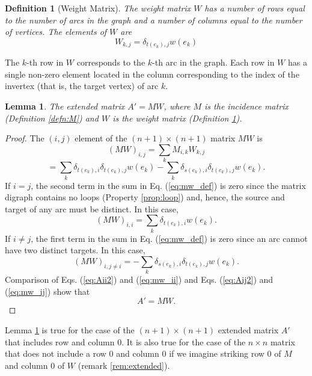 \documentclass{article}
\newtheorem{lemma}{Lemma}
\newtheorem{defn}{Definition}
\begin{document}
\begin{defn}[Weight Matrix]
The weight matrix $W$ has a number of rows equal to the number of arcs
in the graph and a number of columns equal to the number of vertices.
The elements of $W$ are
\begin{equation}
W_{k,j} = \delta_{t(e_k),j}w(e_k)
\label{eq:weight_matrix}
\end{equation}
\label{defn:W}
\end{defn}

The $k$-th row in $W$ corresponds to the $k$-th arc in the graph.
Each row in $W$ has a single non-zero element located in the column
corresponding to the index of the invertex (that is, the target
vertex) of arc $k$.

\begin{lemma}
The extended matrix $A' = MW$, where $M$ is the incidence
matrix (Definition \ref{defn:M}) and $W$ is the weight matrix
(Definition \ref{defn:W}).
\label{lem:mw}
\end{lemma}

\begin{proof}
The $(i,j)$ element of the $(n + 1) \times (n + 1)$ matrix $MW$ is
\[
\left(MW\right)_{i,j} = \sum_k M_{i,k} W_{k,j}
\]
\begin{equation}
= \sum_k \delta_{t(e_k),i}\delta_{t(e_k),j}w(e_k)
- \sum_k \delta_{s(e_k),i}\delta_{t(e_k),j}w(e_k).
\label{eq:mw_def}
\end{equation}
If $i = j$, the second term in the sum in
Eq. (\ref{eq:mw_def}) is zero since the matrix digraph
contains no loops (Property \ref{prop:loop}) and,
hence, the source and target of any arc must be distinct.
In this case,
\begin{equation}
\left(MW\right)_{i,i} = \sum_k \delta_{t(e_k),i}w(e_k).
\label{eq:mw_ii}
\end{equation}
If $i \neq j$, the first term in the sum in
Eq. (\ref{eq:mw_def}) is zero since an arc cannot have two distinct targets.
In this case,
\begin{equation}
\left(MW\right)_{i,j\neq i} = 
- \sum_k \delta_{s(e_k),i}\delta_{t(e_k),j}w(e_k).
\label{eq:mw_ij}
\end{equation}
Comparison of Eqs. (\ref{eq:Aii2}) and (\ref{eq:mw_ii}) and
Eqs. (\ref{eq:Aij2}) and (\ref{eq:mw_ij}) show that
\begin{equation}
A' = M W.
\label{eq:DAMW}
\end{equation}
\end{proof}

Lemma \ref{lem:mw} is true for the case of the $(n + 1) \times (n + 1)$
extended matrix $A'$ that includes row and column $0$.
It is also true for the case of the $n \times n$ matrix that does not
include a row $0$ and column $0$ if we imagine striking row $0$ of
$M$ and column $0$ of $W$ (remark \ref{rem:extended}).
\end{document}
